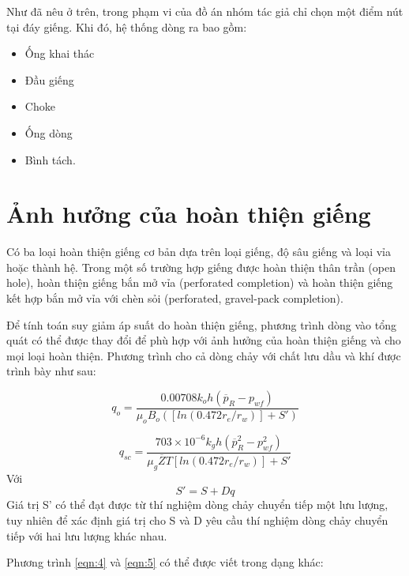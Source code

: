 \documentclass[12pt,a4paper]{report}
\begin{document}
Như đã nêu ở trên, trong phạm vi của đồ án nhóm tác giả chỉ chọn một điểm nút tại đáy giếng. Khi đó, hệ thống dòng ra bao gồm:
	\begin{itemize}
		\item Ống khai thác
		\item Đầu giếng
		\item Choke
		\item Ống dòng
		\item Bình tách.
	\end{itemize}

\section{Ảnh hưởng của hoàn thiện giếng}

Có ba loại hoàn thiện giếng cơ bản dựa trên loại giếng, độ sâu giếng và loại vỉa hoặc thành hệ. Trong một số trường hợp giếng được hoàn thiện thân trần (open hole), hoàn thiện giếng bắn mở vỉa (perforated completion) và hoàn thiện giếng kết hợp bắn mở vỉa với chèn sỏi (perforated, gravel-pack completion).

Để tính toán suy giảm áp suất do hoàn thiện giếng, phương trình dòng vào tổng quát có thể được thay đổi để phù hợp với ảnh hưởng của hoàn thiện giếng và cho mọi loại hoàn thiện. Phương trình cho cả dòng chảy với chất lưu dầu và khí được trình bày như sau:
	
	\begin{equation}\label{eqn:4}
		q_o = \dfrac{0.00708k_oh(\overline p_R-p_{wf})}{\mu_oB_o([ln(0.472r_e/r_w)]+S')}
	\end{equation}
	
	\begin{equation}\label{eqn:5}
		q_{sc}=\dfrac{703\times 10^{-6}k_gh(\overline p_R^2-p_{wf}^2)}{\mu_g\overline ZT[ln(0.472r_e/r_w)]+S'}
	\end{equation}
Với
	\begin{equation}
		S' = S + Dq
	\end{equation}
Giá trị S' có thể đạt được từ thí nghiệm dòng chảy chuyển tiếp một lưu lượng, tuy nhiên để xác định giá trị cho S và D  yêu cầu thí nghiệm dòng chảy chuyển tiếp với hai lưu lượng khác nhau.

Phương trình \ref{eqn:4} và \ref{eqn:5} có thể được viết trong dạng khác:
\end{document}
